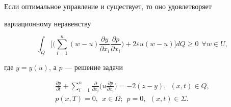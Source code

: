 \begin{thm} 


Если оптимальное управление и существует, то оно удовлетворяет 


вариационному неравенству 


\begin{equation} 


\int_Q\bigg[\bigg(\sum^n_{i=1}(w-u) 


\frac{\partial y}{\partial x_i} 


\frac{\partial p}{\partial x_i}\bigg) 


+2\varepsilon u(w-u)\bigg]d Q\ge0\ \ \forall w\in U, 


\end{equation} 


где $y=y(u)$, а $p$ --- решение задачи 


\begin{gather} 


\frac{\partial p}{\partial t}+\sum^n_{i=1} 


\frac{\partial }{\partial x_i}\bigg(u 


\frac{\partial p}{\partial x_i}\bigg)=-2(z-y),\ \ (x,t)\in Q,\\ 


% 


p(x,T)=0,\ \ x\in\Omega;\ \ p=0,\ \ (x,t)\in\Sigma. 


\end{gather} 


\end{thm} 


 


